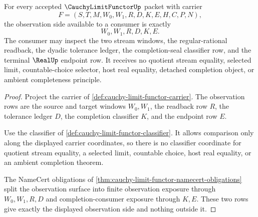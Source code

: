 \begin{theorem}
\label{thm:cauchy-limit-functor-finite-observation-exposure}
For every accepted $\CauchyLimitFunctorUp$ packet with carrier
$$
F=(S,T,M,W_0,W_1,R,D,K,E,H,C,P,N),
$$
the observation side available to a consumer is exactly
$$
W_0,W_1,R,D,K,E.
$$
The consumer may inspect the two stream windows, the regular-rational readback, the dyadic tolerance ledger, the completion-seal classifier row, and the terminal $\RealUp$ endpoint row. It receives no quotient stream equality, selected limit, countable-choice selector, host real equality, detached completion object, or ambient completeness principle.
\end{theorem}
\begin{proof}
Project the carrier of \autoref{def:cauchy-limit-functor-carrier}. The observation rows are the source and target windows $W_0,W_1$, the readback row $R$, the tolerance ledger $D$, the completion classifier $K$, and the endpoint row $E$.

Use the classifier of \autoref{def:cauchy-limit-functor-classifier}. It allows comparison only along the displayed carrier coordinates, so there is no classifier coordinate for quotient stream equality, a selected limit, countable choice, host real equality, or an ambient completion theorem.

The NameCert obligations of \autoref{thm:cauchy-limit-functor-namecert-obligations} split the observation surface into finite observation exposure through $W_0,W_1,R,D$ and completion-consumer exposure through $K,E$. These two rows give exactly the displayed observation side and nothing outside it.
\end{proof}

